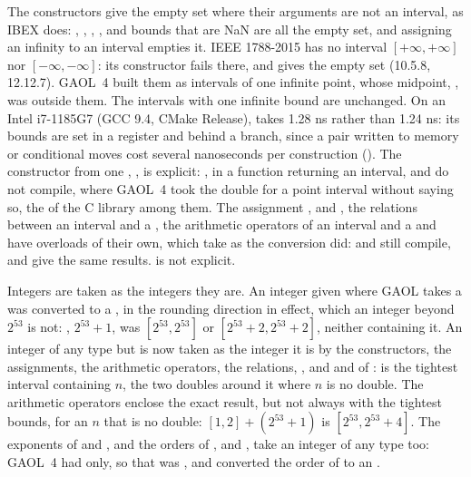 The constructors give the empty set where their arguments are not an
interval, as IBEX does: , ,
, , 
and bounds that are NaN are all the empty set, and assigning an infinity to an
interval empties it.\newinvfive{} IEEE 1788-2015 has no interval
$[+\infty, +\infty]$ nor $[-\infty, -\infty]$: its constructor fails there,
and gives the empty set (10.5.8, 12.12.7). GAOL~4 built them as intervals of
one infinite point, whose midpoint, , was outside them. The
intervals with one infinite bound are unchanged. On an Intel i7-1185G7 (GCC
9.4, CMake Release),  takes 1.28 ns rather than 1.24 ns:
its bounds are set in a register and behind a branch, since a pair written to
memory or conditional moves cost several nanoseconds per construction
(). The constructor from one ,
, is explicit: ,
 in a function returning an interval, 
and  do not compile, where GAOL~4 took the
double for a point interval without saying so, the  of the C
library among them. The assignment ,  and
, the relations between an interval and a , the
arithmetic operators of an interval and a  and
 have overloads of their own, which take
 as the conversion did:  and 
still compile, and give the same results.  is
not explicit.

\medskip
Integers are taken as the integers they are.\newinvfive{} An integer given
where GAOL takes a  was converted to a , in the
rounding direction in effect, which an integer beyond $2^{53}$ is not:
, $2^{53} + 1$, was $[2^{53}, 2^{53}]$ or
$[2^{53} + 2, 2^{53} + 2]$, neither containing it. An integer of any type
but  is now taken as the integer it is by the constructors, the
assignments, the arithmetic operators, the relations, ,
and  and  of
:  is the tightest interval
containing $n$, the two doubles around it where $n$ is no double. The
arithmetic operators enclose the exact result, but not always with the
tightest bounds, for an $n$ that is no double: $[1, 2] + (2^{53} + 1)$ is
$[2^{53}, 2^{53} + 4]$. The exponents of  and , and the
orders of ,  and , take an integer
of any type too: GAOL~4 had  only, so that
 was , and converted the
order of  to an .

